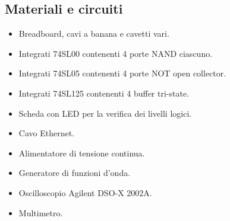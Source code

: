 \subsection{Materiali e circuiti}

\begin{itemize}
    \item{Breadboard, cavi a banana e cavetti vari.}
    \item{Integrati 74SL00 contenenti 4 porte NAND ciascuno.}
    \item{Integrati 74SL05 contenenti 4 porte NOT open collector.}
    \item{Integrati 74SL125 contenenti 4 buffer tri-state.}
    \item{Scheda con LED per la verifica dei livelli logici.}
    \item{Cavo Ethernet.}
    \item{Alimentatore di tensione continua.}
    \item{Generatore di funzioni d'onda.}
    \item{Oscilloscopio Agilent DSO-X 2002A.}
    \item{Multimetro.}
\end{itemize}
